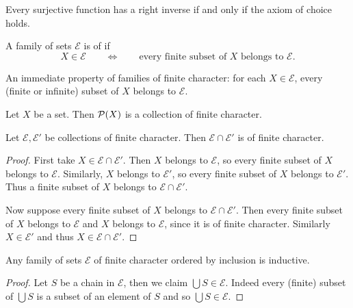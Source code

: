 \begin{lemma} \label{surjectiveInverse}
Every surjective function has a right inverse \textup{if and only if} the axiom of choice holds.
\end{lemma}

\begin{definition}
A family of sets $\mathcal{E}$ is of  if
\[ X\in \mathcal{E} \qquad \iff \qquad \text{every finite subset of $X$ belongs to $\mathcal{E}$.} \]
\end{definition}
An immediate property of families of finite character: for each $X\in \mathcal{E}$, every (finite or infinite) subset of $X$ belongs to $\mathcal{E}$.

\begin{example}
Let $X$ be a set. Then $\operatorname{\mathcal{P}}(X)$ is a collection of finite character.
\end{example}

\begin{lemma}
Let $\mathcal{E}, \mathcal{E}'$ be collections of finite character. Then $\mathcal{E}\cap \mathcal{E}'$ is of finite character.
\end{lemma}
\begin{proof}
First take $X\in \mathcal{E}\cap \mathcal{E}'$. Then $X$ belongs to $\mathcal{E}$, so every finite subset of $X$ belongs to $\mathcal{E}$. Similarly, $X$ belongs to $\mathcal{E}'$, so every finite subset of $X$ belongs to $\mathcal{E}'$. Thus a finite subset of $X$ belongs to $\mathcal{E}\cap \mathcal{E}'$.

Now suppose every finite subset of $X$ belongs to $\mathcal{E}\cap \mathcal{E}'$. Then every finite subset of $X$ belongs to $\mathcal{E}$ and $X$ belongs to $\mathcal{E}$, since it is of finite character. Similarly $X\in \mathcal{E}'$ and thus $X\in \mathcal{E}\cap\mathcal{E}'$.
\end{proof}

\begin{lemma} \label{finiteCharacterInductive}
Any family of sets $\mathcal{E}$ of finite character ordered by inclusion is inductive.
\end{lemma}
\begin{proof}
Let $S$ be a chain in $\mathcal{E}$, then we claim $\bigcup S \in \mathcal{E}$. Indeed every (finite) subset of $\bigcup S$ is a subset of an element of $S$ and so $\bigcup S\in \mathcal{E}$.
\end{proof}

